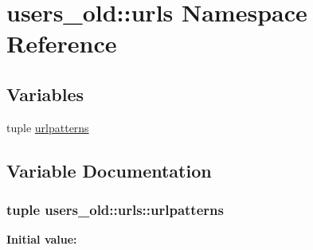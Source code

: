 \hypertarget{namespaceusers__old_1_1urls}{
\section{users\_\-old::urls Namespace Reference}
\label{namespaceusers__old_1_1urls}
}
\subsection*{Variables}
\begin{DoxyCompactItemize}
\item 
tuple \hyperlink{namespaceusers__old_1_1urls_a195ba2853cd1001977eeee31a83de5b1}{urlpatterns}
\end{DoxyCompactItemize}


\subsection{Variable Documentation}
\hypertarget{namespaceusers__old_1_1urls_a195ba2853cd1001977eeee31a83de5b1}{
\subsubsection[{urlpatterns}]{\setlength{\rightskip}{0pt plus 5cm}tuple {\bf users\_\-old::urls::urlpatterns}}}
\label{namespaceusers__old_1_1urls_a195ba2853cd1001977eeee31a83de5b1}
{\bfseries Initial value:}
